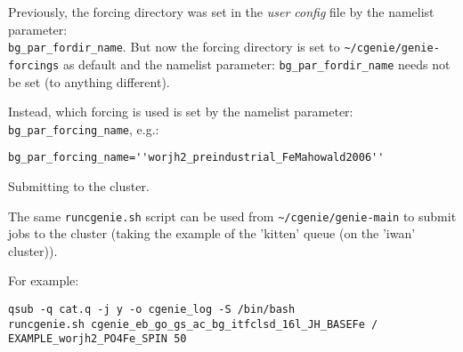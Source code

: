 \documentclass[10pt,twoside]{article}
\begin{document}
\begin{compactenum}
\item Previously, the forcing directory was set in the \textit{user config} file by the namelist parameter:
\\ \texttt{bg\_par\_fordir\_name}. But now the forcing directory is set to \texttt{\~{}/cgenie/genie-forcings} as default and the namelist parameter: \texttt{bg\_par\_fordir\_name} needs not be set (to anything different).

Instead, which forcing is used is set by the namelist parameter: \texttt{bg\_par\_forcing\_name}, e.g.:
\vspace{-5pt}\begin{verbatim}
bg_par_forcing_name=''worjh2_preindustrial_FeMahowald2006''
\end{verbatim}\vspace{-0pt}

\item  Submitting to the cluster.

The same \texttt{runcgenie.sh} script can be used from \texttt{\~{}/cgenie/genie-main} to submit jobs to the cluster (taking the example of the 'kitten' queue (on the 'iwan' cluster)).
        
For example:
\vspace{-5pt}\begin{verbatim}
qsub -q cat.q -j y -o cgenie_log -S /bin/bash
runcgenie.sh cgenie_eb_go_gs_ac_bg_itfclsd_16l_JH_BASEFe / 
EXAMPLE_worjh2_PO4Fe_SPIN 50
\end{verbatim}\vspace{-5pt}
  
\end{compactenum}


\end{document}
